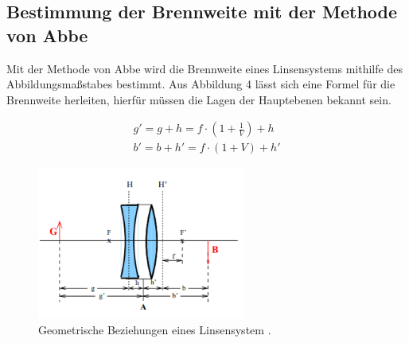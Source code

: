 \subsection{Bestimmung der Brennweite mit der Methode von Abbe}
Mit der Methode von Abbe wird die Brennweite eines Linsensystems mithilfe des Abbildungsmaßstabes bestimmt.
Aus Abbildung 4 lässt sich eine Formel für die Brennweite herleiten, hierfür müssen die Lagen
der Hauptebenen bekannt sein.

\begin{align}
  g'= g + h = f \cdot \left(1 + \frac{1}{V} \right) + h \\
  b' = b + h' = f \cdot (1+V) + h'
\end{align}

\begin{figure}[H]
  \centering
  \includegraphics[height=5cm]{abbe.PNG}
  \caption{Geometrische Beziehungen eines Linsensystem \cite{sample}.}
  \label{fig:biegungbild1}
\end{figure}
